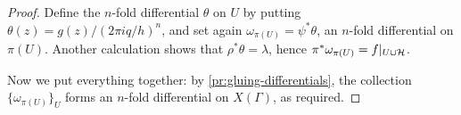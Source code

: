 \begin{proof}
 Define the $n$-fold differential $\theta$ on $U$ by putting $\theta(z)=g(z)/(2\pi i q / h)^n$, and set again $\omega_{\pi(U)}=\psi^*\theta$, an $n$-fold differential on $\pi(U)$. Another calculation shows that $\rho^*\theta=\lambda$, hence $\pi^*\omega_{\pi(U)}=f|_{U\cup \mathcal{H}}$.
 
 Now we put everything together: by \ref{pr:gluing-differentials}, the collection $\{\omega_{\pi(U)}\}_U$ forms an $n$-fold differential on $X(\Gamma)$, as required.
\end{proof}





